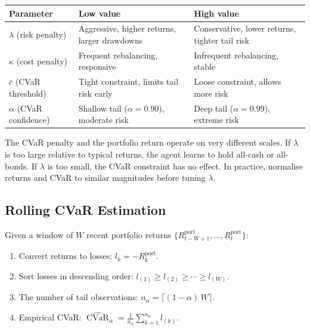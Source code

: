 \documentclass[11pt, a4paper]{article}
\theoremstyle{definition}
\theoremstyle{plain}
\theoremstyle{remark}
\newcommand{\CVaR}{\operatorname{CVaR}}
\begin{document}
\begin{center}
\begin{tabular}{lll}
\toprule
\textbf{Parameter} & \textbf{Low value} & \textbf{High value} \\
\midrule
$\lambda$ (risk penalty)       & Aggressive, higher returns,
                                 larger drawdowns
                               & Conservative, lower returns,
                                 tighter tail risk \\
$\kappa$ (cost penalty)        & Frequent rebalancing,
                                 responsive
                               & Infrequent rebalancing,
                                 stable \\
$\bar{c}$ (CVaR threshold)    & Tight constraint, limits
                                 tail risk early
                               & Loose constraint, allows
                                 more risk \\
$\alpha$ (CVaR confidence)     & Shallow tail ($\alpha=0.90$),
                                 moderate risk
                               & Deep tail ($\alpha=0.99$),
                                 extreme risk \\
\bottomrule
\end{tabular}
\end{center}

\begin{warningbox}
The CVaR penalty and the portfolio return operate on very different scales.
If $\lambda$ is too large relative to typical returns, the agent learns to
hold all-cash or all-bonds. If $\lambda$ is too small, the CVaR constraint
has no effect. In practice, normalise returns and CVaR to similar
magnitudes before tuning $\lambda$.
\end{warningbox}

\subsection{Rolling CVaR Estimation}

Given a window of $W$ recent portfolio returns
$\{R^{\text{port}}_{t-W+1}, \ldots, R^{\text{port}}_t\}$:
\begin{enumerate}[leftmargin=2em]
    \item Convert returns to losses: $l_k = -R^{\text{port}}_k$.
    \item Sort losses in descending order:
          $l_{(1)} \geq l_{(2)} \geq \cdots \geq l_{(W)}$.
    \item The number of tail observations:
          $n_\alpha = \lceil (1-\alpha)\,W \rceil$.
    \item Empirical CVaR:
          $\widehat{\CVaR}_\alpha = \frac{1}{n_\alpha}
          \sum_{k=1}^{n_\alpha} l_{(k)}$.
\end{enumerate}
\end{document}
